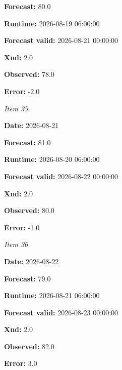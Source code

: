 \documentclass[11pt]{article}
\begin{document}
\par\noindent\textbf{Forecast:} 80.0

\par\noindent\textbf{Runtime:} 2026-08-19 06:00:00

\par\noindent\textbf{Forecast valid:} 2026-08-21 00:00:00

\par\noindent\textbf{Xnd:} 2.0

\par\noindent\textbf{Observed:} 78.0

\par\noindent\textbf{Error:} -2.0

\par\noindent\textit{Item 35.}\par \par\noindent\textbf{Date:} 2026-08-21

\par\noindent\textbf{Forecast:} 81.0

\par\noindent\textbf{Runtime:} 2026-08-20 06:00:00

\par\noindent\textbf{Forecast valid:} 2026-08-22 00:00:00

\par\noindent\textbf{Xnd:} 2.0

\par\noindent\textbf{Observed:} 80.0

\par\noindent\textbf{Error:} -1.0

\par\noindent\textit{Item 36.}\par \par\noindent\textbf{Date:} 2026-08-22

\par\noindent\textbf{Forecast:} 79.0

\par\noindent\textbf{Runtime:} 2026-08-21 06:00:00

\par\noindent\textbf{Forecast valid:} 2026-08-23 00:00:00

\par\noindent\textbf{Xnd:} 2.0

\par\noindent\textbf{Observed:} 82.0

\par\noindent\textbf{Error:} 3.0
\end{document}
